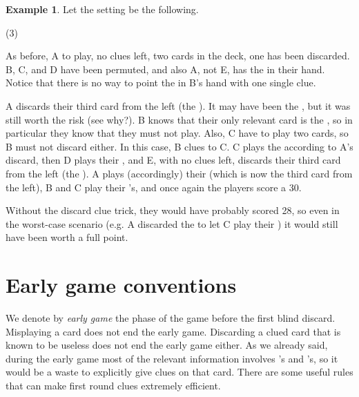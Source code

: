 \documentclass[a4paper]{article}
\theoremstyle{plain}
\theoremstyle{definition}
\newtheorem{example}[theorem]{Example}
\begin{document}
\begin{example}
	
	Let the setting be the following.
	
	\begin{tasks}(3)
		\task[+]      
		\task[A]    
		\task[B]    
		\task[C]    
		\task[D]    
		\task[E]    
	\end{tasks}
	
	As before, A to play, no clues left, two cards in the deck, one  has been discarded. B, C, and D have been permuted, and also A, not E, has the  in their hand. Notice that there is no way to point the  in B's hand with one single clue.
	
	A discards their third card from the left (the ). It may have been the , but it was still worth the risk (see why?). B knows that their only relevant card is the , so in particular they know that they must not play. Also, C have to play two cards, so B must not discard either. In this case, B clues  to C. C plays the  according to A's discard, then D plays their , and E, with no clues left, discards their third card from the left (the ). A plays (accordingly) their  (which is now the third card from the left), B and C play their 's, and once again the players score a 30.
\end{example}

Without the discard clue trick, they would have probably scored 28, so even in the worst-case scenario (e.g. A discarded the  to let C play their ) it would still have been worth a full point.

\section{Early game conventions}
\label{sec:earlygame}

We denote by \textit{early game} the phase of the game before the first blind discard. Misplaying a card does not end the early game. Discarding a clued card that is known to be useless does not end the early game either. As we already said, during the early game most of the relevant information involves 's and 's, so it would be a waste to explicitly give clues on that card. There are some useful rules that can make first round clues extremely efficient.
\end{document}
